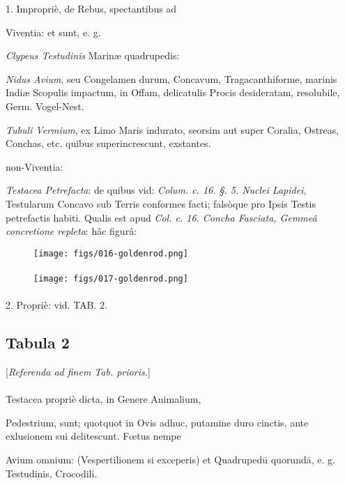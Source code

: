 \documentclass[a4paper, 11pt, oneside, polutonikogreek, german]{article}
\begin{document}
1. Impropriè, de Rebus, spectantibus ad

Viventia: et sunt, e. g.

\emph{Clypeus Testudinis} Marinæ quadrupedis:

\emph{Nidus Avium}, seu Congelamen durum, Concavum, Tragacanthiforme, marinis Indiæ Scopulis impactum, in Offam, delicatulis Procis desideratam, resolubile, Germ. Vogel-Nest.

\emph{Tubuli Vermium}, ex Limo Maris indurato, seorsim aut super Coralia, Ostreas, Conchas, etc. quibus superincrescunt, exstantes.

non-Viventia:

\emph{Testacea Petrefacta}: de quibus vid: \emph{Colum. c. 16. §. 5. Nuclei Lapidei}, Testularum Concavo sub Terris conformes facti; falsòque pro Ipsis Testis petrefactis habiti. Qualis est apud \emph{Col. c. 16. Concha Fasciata, Gemmeâ concretione repleta}: hâc figurâ:

\begin{figure}[H]
\centering
\texttt{[image: figs/016-goldenrod.png]}
\end{figure}
\paragraph{}

\begin{figure}[H]
\centering
\texttt{[image: figs/017-goldenrod.png]}
\end{figure}
\paragraph{}

2. Propriè: vid. TAB. 2.
\clearpage
\subsection{Tabula 2}
\begin{center}
[\emph{Referenda ad finem Tab. prioris.}]
\end{center}
\paragraph{}
Testacea propriè dicta, in Genere Animalium,

Pedestrium, sunt; quotquot in Ovis adhuc, putamine duro cinctis, ante exlusionem sui delitescunt. Fœtus nempe

Avium omnium: (Vespertilionem si exceperis) et Quadrupedū quorundā, e. g. Testudinis, Crocodili.
\end{document}
